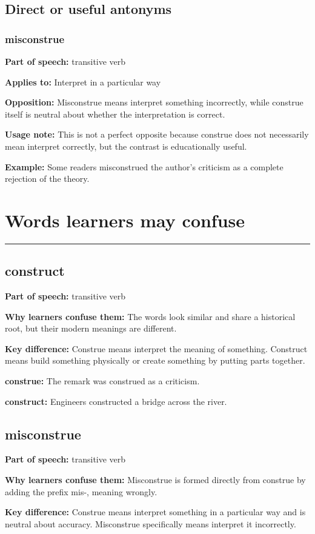 \documentclass[11pt]{article}
\newcommand{\sectionrule}{\par\vspace{-0.5em}\noindent\textcolor{Accent}{\rule{\linewidth}{0.6pt}}\par}
\begin{document}
\subsection{Direct or useful antonyms}
\subsubsection{misconstrue}
\textbf{Part of speech:} transitive verb

\textbf{Applies to:} Interpret in a particular way

\textbf{Opposition:} Misconstrue means interpret something incorrectly, while construe itself is neutral about whether the interpretation is correct.

\textbf{Usage note:} This is not a perfect opposite because construe does not necessarily mean interpret correctly, but the contrast is educationally useful.

\textbf{Example:} Some readers misconstrued the author's criticism as a complete rejection of the theory.

\section{Words learners may confuse}
\sectionrule
\subsection{construct}
\textbf{Part of speech:} transitive verb

\textbf{Why learners confuse them:} The words look similar and share a historical root, but their modern meanings are different.

\textbf{Key difference:} Construe means interpret the meaning of something. Construct means build something physically or create something by putting parts together.

\textbf{construe:} The remark was construed as a criticism.

\textbf{construct:} Engineers constructed a bridge across the river.

\subsection{misconstrue}
\textbf{Part of speech:} transitive verb

\textbf{Why learners confuse them:} Misconstrue is formed directly from construe by adding the prefix mis-, meaning wrongly.

\textbf{Key difference:} Construe means interpret something in a particular way and is neutral about accuracy. Misconstrue specifically means interpret it incorrectly.
\end{document}
